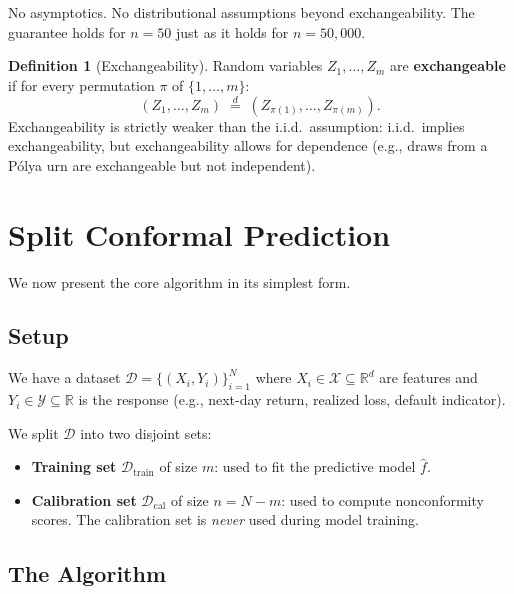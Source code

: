 \documentclass[11pt, a4paper]{article}
\theoremstyle{definition}
\newtheorem{definition}{Definition}[section]
\theoremstyle{plain}
\theoremstyle{remark}
\newcommand{\RV}{\mathbb{R}}
\newcommand{\Dcal}{\mathcal{D}}
\newcommand{\Xcal}{\mathcal{X}}
\newcommand{\Ycal}{\mathcal{Y}}
\begin{document}
No asymptotics.
No distributional assumptions beyond exchangeability.
The guarantee holds for $n = 50$ just as it holds for $n = 50{,}000$.

\begin{definition}[Exchangeability]\label{def:exchangeability}
Random variables $Z_1, \ldots, Z_m$ are \textbf{exchangeable} if for every
permutation $\pi$ of $\{1, \ldots, m\}$:
\begin{equation}
    (Z_1, \ldots, Z_m) \;\overset{d}{=}\; (Z_{\pi(1)}, \ldots, Z_{\pi(m)}).
\end{equation}
Exchangeability is strictly weaker than the i.i.d.\ assumption: i.i.d.\ implies
exchangeability, but exchangeability allows for dependence (e.g., draws from a
P\'{o}lya urn are exchangeable but not independent).
\end{definition}


\section{Split Conformal Prediction}
\label{sec:split-conformal}

We now present the core algorithm in its simplest form.

\subsection{Setup}

We have a dataset $\Dcal = \{(X_i, Y_i)\}_{i=1}^{N}$ where $X_i \in \Xcal
\subseteq \RV^d$ are features and $Y_i \in \Ycal \subseteq \RV$ is the response
(e.g., next-day return, realized loss, default indicator).

We split $\Dcal$ into two disjoint sets:
\begin{itemize}
    \item \textbf{Training set} $\Dcal_{\mathrm{train}}$ of size $m$: used to fit
          the predictive model $\hat{f}$.
    \item \textbf{Calibration set} $\Dcal_{\mathrm{cal}}$ of size $n = N - m$: used
          to compute nonconformity scores.
          The calibration set is \emph{never} used during model training.
\end{itemize}

\subsection{The Algorithm}
\end{document}
